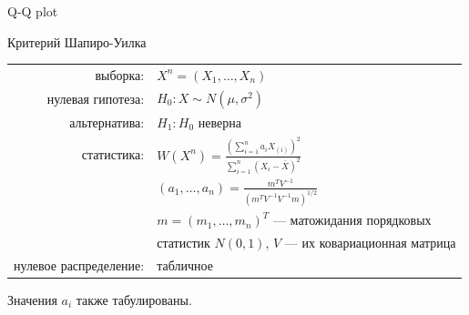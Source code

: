 \documentclass[9pt,pdf,utf8,hyperref={unicode},aspectratio=169]{beamer}
\begin{document}
\begin{frame}{Q-Q plot}
\end{frame}


\begin{frame}{Критерий Шапиро-Уилка}
	\begin{center}
		\begin{tabular}{rl}
			выборка:                        & $X^n=\left(X_1,\ldots,X_n\right)$         \\
			нулевая гипотеза:               & $H_0\colon X \sim N\left(\mu,\sigma^2\right)$ \\
			альтернатива:                   & $H_1\colon H_0$ неверна \\
			статистика:                     & $W \left(X^n\right) = \frac{\left(\sum\limits_{i=1}^n a_i X_{(i)}\right)^2}{\sum\limits_{i=1}^n\left(X_i-\bar{X}\right)^2}$ \\
			& $\left(a_1,\ldots,a_n\right) = \frac{m^TV^{-1}}{\left(m^TV^{-1}V^{-1}m\right)^{1/2}}$ \\
			& $m=\left(m_1,\ldots,m_n\right)^T$ --- матожидания порядковых \\
			& статистик $N(0,1)$, $V$ --- их ковариационная матрица \\
			нулевое распределение:          & табличное\\
		\end{tabular}
	\end{center}
	Значения $a_i$ также табулированы.
\end{frame}
\end{document}
